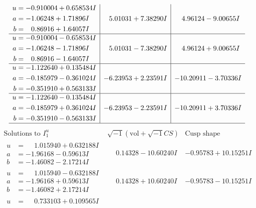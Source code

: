 \documentclass[1p]{elsarticle_modified}
\theoremstyle{definition}
\newcommand{\I}{\sqrt{-1}}
\begin{document}
$$\begin{array}{c|c|c}
\begin{aligned}
u &= -0.910004 + 0.658534 I \\
a &= -1.06248 + 1.71896 I \\
b &= \phantom{-}0.86916 + 1.64057 I\end{aligned}
 & \phantom{-}5.01031 + 7.38290 I & \phantom{-}4.96124 - 9.00655 I \\ \hline\begin{aligned}
u &= -0.910004 - 0.658534 I \\
a &= -1.06248 - 1.71896 I \\
b &= \phantom{-}0.86916 - 1.64057 I\end{aligned}
 & \phantom{-}5.01031 - 7.38290 I & \phantom{-}4.96124 + 9.00655 I \\ \hline\begin{aligned}
u &= -1.122640 + 0.135484 I \\
a &= -0.185979 - 0.361024 I \\
b &= -0.351910 + 0.563133 I\end{aligned}
 & -6.23953 + 2.23591 I & -10.20911 - 3.70336 I \\ \hline\begin{aligned}
u &= -1.122640 - 0.135484 I \\
a &= -0.185979 + 0.361024 I \\
b &= -0.351910 - 0.563133 I\end{aligned}
 & -6.23953 - 2.23591 I & -10.20911 + 3.70336 I\\
 \hline 
 \end{array}$$\newpage$$\begin{array}{c|c|c}  
\text{Solutions to }I^u_{1}& \I (\text{vol} + \sqrt{-1}CS) & \text{Cusp shape}\\
 \hline 
\begin{aligned}
u &= \phantom{-}1.015940 + 0.632188 I \\
a &= -1.96168 - 0.59613 I \\
b &= -1.46082 - 2.17214 I\end{aligned}
 & \phantom{-}0.14328 - 10.60240 I & -0.95783 + 10.15251 I \\ \hline\begin{aligned}
u &= \phantom{-}1.015940 - 0.632188 I \\
a &= -1.96168 + 0.59613 I \\
b &= -1.46082 + 2.17214 I\end{aligned}
 & \phantom{-}0.14328 + 10.60240 I & -0.95783 - 10.15251 I \\ \hline\begin{aligned}
u &= \phantom{-}0.733103 + 0.109565 I \\

\end{aligned}
\end{array}$$
\end{document}
